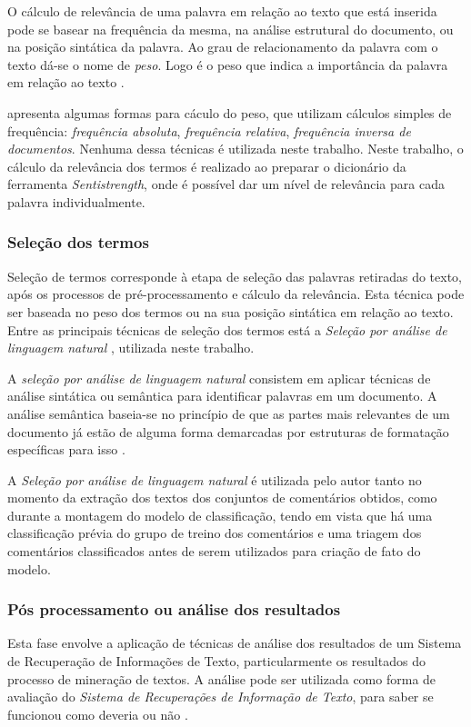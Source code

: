 O cálculo de relevância de uma palavra em relação ao texto que está inserida pode se basear na frequência da mesma, na análise estrutural do documento, ou na posição sintática da palavra. Ao grau de relacionamento da palavra com o texto dá-se o nome de \textit{peso}. Logo é o peso que indica a importância da palavra em relação ao texto \cite{morais2007mineraccao}. 

\cite{morais2007mineraccao} apresenta algumas formas para cáculo do peso, que utilizam cálculos simples de frequência: \textit{frequência absoluta}, \textit{frequência relativa}, \textit{frequência inversa de documentos}. Nenhuma dessa técnicas é utilizada neste trabalho. Neste trabalho, o cálculo da relevância dos termos é realizado ao preparar o dicionário da ferramenta \textit{Sentistrength}, onde é possível dar um nível de relevância para cada palavra individualmente.

\subsubsection{Seleção dos termos}
Seleção de termos corresponde à etapa de seleção das palavras retiradas do texto, após os
processos de pré-processamento e cálculo da relevância. Esta técnica pode ser baseada no peso dos termos ou na sua posição sintática em relação ao texto. Entre as principais técnicas de seleção dos termos está a \textit{Seleção por análise de linguagem natural} \cite{morais2007mineraccao}, utilizada neste trabalho.

A \textit{seleção por análise de linguagem natural} consistem em aplicar técnicas de análise sintática ou semântica para identificar palavras em um documento. A análise semântica baseia-se no princípio de que as partes mais relevantes de um documento já estão de alguma forma demarcadas por estruturas de formatação específicas para isso \cite{morais2007mineraccao}.

A \textit{Seleção por análise de linguagem natural} é utilizada pelo autor tanto no momento da extração dos textos dos conjuntos de comentários obtidos, como durante a montagem do modelo de classificação, tendo em vista que há uma classificação prévia do grupo de treino dos comentários e uma triagem dos comentários classificados antes de serem utilizados para criação de fato do modelo.

\subsubsection{Pós processamento ou análise dos resultados}
Esta fase envolve a aplicação de técnicas de análise dos resultados de um Sistema de Recuperação de Informações de Texto, particularmente os resultados do processo de mineração de textos. A análise pode ser utilizada como forma de avaliação do \textit{Sistema de Recuperações de Informação de Texto}, para saber se funcionou como deveria ou não \cite{morais2007mineraccao}.

